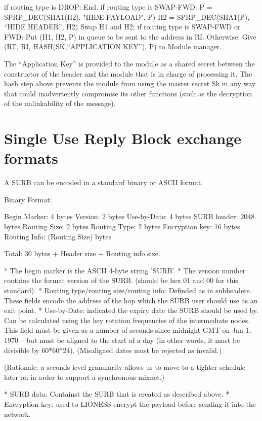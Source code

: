 	if routing type is DROP:
                End.
	if routing type is SWAP-FWD:
                P = SPRP_DEC(SHA1(H2), "HIDE PAYLOAD", P)
		H2 = SPRP_DEC(SHA1(P), ``HIDE HEADER'', H2)
		Swap H1 and H2;
        if routing type is SWAP-FWD or FWD:
	   	Put (H1, H2, P) in queue to be sent to the address in RI.
        Otherwise:
		Give (RT, RI, HASH(SK,``APPLICATION KEY''), P) to
		Module manager. 

The ``Application Key'' is provided to the module as a shared secret
between the constructor of the header and the module that is in charge
of processing it.  The hash step above prevents the module from using
the master secret Sk in any way that could inadvertently compromise
its other functions (such as the decryption of the unlinkability of
the message).

\section{Single Use Reply Block exchange formats}

A SURB can be encoded in a standard binary or ASCII format.

Binary Format:

   Begin Marker: 4 bytes
   Version:      2 bytes
   Use-by-Date:  4 bytes
   SURB header:  2048 bytes
   Routing Size: 2 bytes
   Routing Type: 2 bytes
   Encryption key: 16 bytes
   Routing Info: (Routing Size) bytes

   Total: 30 bytes + Header size + Routing info size.

* The begin marker is the ASCII 4-byte string 'SURB'. 
* The version number contains the format version of the SURB.
  (should be hex 01 and 00 for this standard).
* Routing type/routing size/routing info: Definded as in subheaders.  
  These fields encode the address of the hop which the SURB user should
  use as an exit point.
* Use-by-Date: indicated the expiry date the SURB should be used by. Can
  be calculated using the key rotation frequencies of the intermediate
  nodes.  This field must be given as a number of seconds since
  midnight GMT on Jan 1, 1970 -- but must be aligned to the start of a
  day (in other words, it must be divisible by 60*60*24).
  (Misaligned dates must be rejected as invalid.)

  (Rationale: a seconds-level granularity allows us to move to a
  tighter schedule later on in order to support a synchronous mixnet.)

* SURB data: Containst the SURB that is created as described
  above. 
* Encryption key: used to LIONESS-encrypt the payload before sending it
  into the network.  

